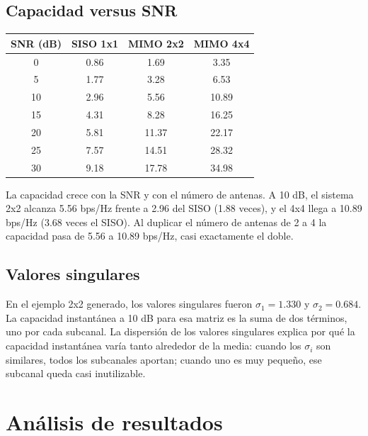 \documentclass[11pt,a4paper]{article}
\begin{document}
\subsection{Capacidad versus SNR}

\begin{tabular}{@{}cccc@{}}
  \toprule
  SNR (dB) & SISO 1x1 & MIMO 2x2 & MIMO 4x4 \\
  \midrule
  0  & 0.86  & 1.69  & 3.35 \\
  5  & 1.77  & 3.28  & 6.53 \\
  10 & 2.96  & 5.56  & 10.89 \\
  15 & 4.31  & 8.28  & 16.25 \\
  20 & 5.81  & 11.37 & 22.17 \\
  25 & 7.57  & 14.51 & 28.32 \\
  30 & 9.18  & 17.78 & 34.98 \\
  \bottomrule
\end{tabular}


La capacidad crece con la SNR y con el número de antenas. A 10 dB, el sistema 2x2 alcanza
5.56 bps/Hz frente a 2.96 del SISO (1.88 veces), y el 4x4 llega a 10.89 bps/Hz (3.68 veces
el SISO). Al duplicar el número de antenas de 2 a 4 la capacidad pasa de 5.56 a
10.89 bps/Hz, casi exactamente el doble.

\subsection{Valores singulares}


En el ejemplo 2x2 generado, los valores singulares fueron $\sigma_1=1.330$ y
$\sigma_2=0.684$. La capacidad instantánea a 10 dB para esa matriz es la suma de dos
términos, uno por cada subcanal. La dispersión de los valores singulares explica por qué la
capacidad instantánea varía tanto alrededor de la media: cuando los $\sigma_i$ son
similares, todos los subcanales aportan; cuando uno es muy pequeño, ese subcanal queda
casi inutilizable.

\section{Análisis de resultados}
\end{document}
